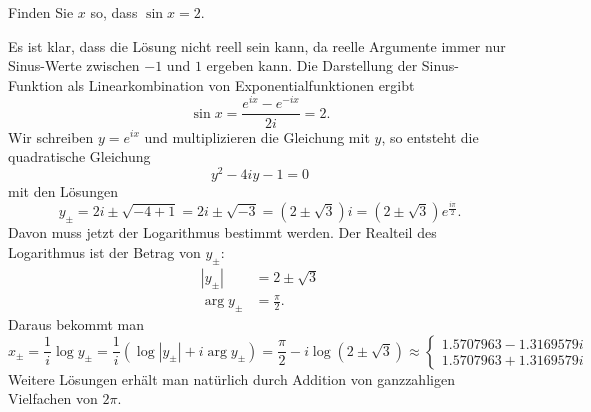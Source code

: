 Finden Sie $x$ so, dass $\sin x = 2$.

\begin{loesung}
Es ist klar, dass die Lösung nicht reell sein kann, da reelle
Argumente immer nur Sinus-Werte zwischen $-1$ und $1$ ergeben kann.
Die Darstellung der Sinus-Funktion als Linearkombination von
Exponentialfunktionen ergibt
\[
\sin x = \frac{e^{ix}-e^{-ix}}{2i} = 2.
\]
Wir schreiben $y=e^{ix}$ und multiplizieren die Gleichung mit $y$,
so entsteht die quadratische Gleichung
\[
y^2-4iy-1=0
\]
mit den Lösungen
\[
y_{\pm}
=
2i\pm \sqrt{-4+1}
=
2i\pm \sqrt{-3}
=
(2\pm \sqrt{3})i
=
(2\pm\sqrt{3})e^{\frac{i\pi}2}.
\]
Davon muss jetzt der Logarithmus bestimmt werden.
Der Realteil des Logarithmus ist der Betrag von $y_\pm$:
\begin{align*}
|y_\pm| &= 2\pm \sqrt{3}
\\
\operatorname{arg} y_\pm &= \frac{\pi}2.
\end{align*}
Daraus bekommt man
\[
x_\pm
=
\frac{1}{i}
\log y_\pm
=
\frac{1}{i}
(
\log |y_\pm|
+
i\arg y_\pm
)
=
\frac{\pi}2
-i
\log(2\pm\sqrt{3})
\approx
\begin{cases}
1.5707963 - 1.3169579i\\
1.5707963 + 1.3169579i
\end{cases}
\]
Weitere Lösungen erhält man natürlich durch Addition von ganzzahligen
Vielfachen von $2\pi$.
\end{loesung}
